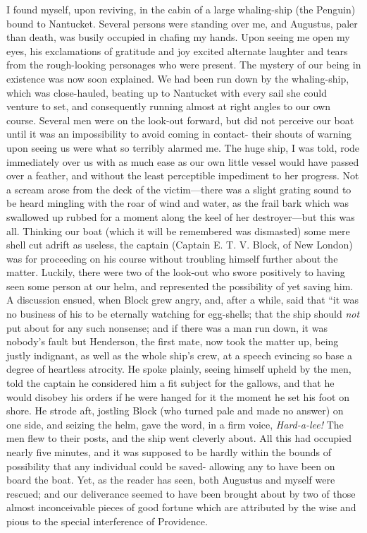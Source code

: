 I found myself, upon reviving, in the cabin of a large whaling-ship (the
Penguin) bound to Nantucket. Several persons were standing over me, and
Augustus, paler than death, was busily occupied in chafing my hands. Upon seeing
me open my eyes, his exclamations of gratitude and joy excited alternate
laughter and tears from the rough-looking personages who were present. The
mystery of our being in existence was now soon explained. We had been run down
by the whaling-ship, which was close-hauled, beating up to Nantucket with every
sail she could venture to set, and consequently running almost at right angles
to our own course. Several men were on the look-out forward, but did not
perceive our boat until it was an impossibility to avoid coming in contact-
their shouts of warning upon seeing us were what so terribly alarmed me. The
huge ship, I was told, rode immediately over us with as much ease as our own
little vessel would have passed over a feather, and without the least
perceptible impediment to her progress. Not a scream arose from the deck of the
victim---there was a slight grating sound to be heard mingling with the roar of
wind and water, as the frail bark which was swallowed up rubbed for a moment
along the keel of her destroyer---but this was all. Thinking our boat (which it
will be remembered was dismasted) some mere shell cut adrift as useless, the
captain (Captain E. T. V. Block, of New London) was for proceeding on his course
without troubling himself further about the matter. Luckily, there were two of
the look-out who swore positively to having seen some person at our helm, and
represented the possibility of yet saving him. A discussion ensued, when Block
grew angry, and, after a while, said that ``it was no business of his to be
eternally watching for egg-shells; that the ship should \emph{not} put about for
any such nonsense; and if there was a man run down, it was nobody's fault but
Henderson, the first mate, now took the matter up, being justly indignant, as
well as the whole ship's crew, at a speech evincing so base a degree of
heartless atrocity. He spoke plainly, seeing himself upheld by the men, told the
captain he considered him a fit subject for the gallows, and that he would
disobey his orders if he were hanged for it the moment he set his foot on shore.
He strode aft, jostling Block (who turned pale and made no answer) on one side,
and seizing the helm, gave the word, in a firm voice, \emph{Hard-a-lee!} The men
flew to their posts, and the ship went cleverly about. All this had occupied
nearly five minutes, and it was supposed to be hardly within the bounds of
possibility that any individual could be saved- allowing any to have been on
board the boat. Yet, as the reader has seen, both Augustus and myself were
rescued; and our deliverance seemed to have been brought about by two of those
almost inconceivable pieces of good fortune which are attributed by the wise and
pious to the special interference of Providence. 


